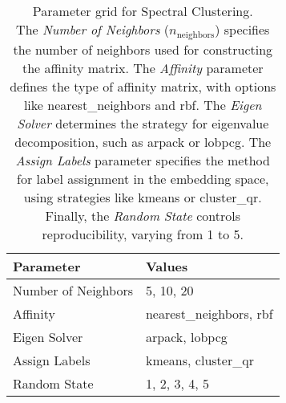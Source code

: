 \begin{table}[htb]
\centering
\begin{tabularx}{\columnwidth}{|X|X|}
    \hline
    \textbf{Parameter} & \textbf{Values} \\ \hline
    Number of Neighbors & 5, 10, 20 \\ \hline
    Affinity & nearest\_neighbors, rbf \\ \hline
    Eigen Solver & arpack, lobpcg \\ \hline
    Assign Labels & kmeans, cluster\_qr \\ \hline
    Random State & 1, 2, 3, 4, 5 \\ \hline
\end{tabularx}
\caption{
    Parameter grid for Spectral Clustering.\\ 
    The \textit{Number of Neighbors} (\(n_{\text{neighbors}}\)) specifies the number of neighbors used for constructing the affinity matrix.
    The \textit{Affinity} parameter defines the type of affinity matrix, with options like nearest\_neighbors and rbf.
    The \textit{Eigen Solver} determines the strategy for eigenvalue decomposition, such as arpack or lobpcg.
    The \textit{Assign Labels} parameter specifies the method for label assignment in the embedding space, using strategies like kmeans or cluster\_qr.
    Finally, the \textit{Random State} controls reproducibility, varying from 1 to 5.
}
\label{tab:spectral-param-grid}
\end{table}





